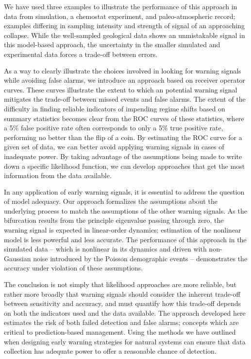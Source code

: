 \documentclass[authoryear,review,11pt]{elsarticle}
\begin{document}
We have used three examples to illustrate the performance of this approach in data from 
simulation, a chemostat experiment, and paleo-atmospheric record; examples differing in 
sampling intensity and strength of signal of an approaching collapse.  
While the well-sampled geological data shows an unmistakable signal in this model-based approach,
the uncertainty in the smaller simulated and experimental data forces a trade-off between errors.  
 
As a way to clearly illustrate the choices involved in looking for warning signals while avoiding false alarms,
we introduce an approach based on receiver operator curves. 
These curves illustrate the extent to which an potential warning signal mitigates the trade-off 
between missed events and false alarms.  
The extent of the difficulty in finding reliable indicators of impending regime shifts
based on summary statistics becomes clear from the ROC curves of these statistics,
where a 5\% false positive rate often corresponds to only a 5\% true positive rate,
performing no better than the flip of a coin. 
By estimating the ROC curve for a given set of data,
we can better avoid applying warning signals in cases of inadequate power.
By taking advantage of the assumptions being made to write down a specific likelihood function,
we can develop approaches that get the most information from the data available.


In any application of early warning signals, it is essential to address the question of model adequacy.
Our approach formalizes the assumptions about the underlying process to match the assumptions of the other warning signals.
As the bifurcation results from the principle eigenvalue passing through zero,
the warning signal is expected in linear-order dynamics;
estimation of the nonlinear model is less powerful and less accurate.
The performance of this approach in the simulated data -- which is nonlinear in its dynamics
and driven with non-Gaussian noise introduced by the Poisson demographic events --
demonstrates the accuracy under violation of these assumptions.

The conclusion is not simply that likelihood approaches are more reliable,
but rather more broadly that warning signals should consider
the inherent trade-off between sensitivity and accuracy,
and must quantify how this trade-off depends on both the indicators used and the data available.
The approach developed here estimates the risk of both failed detection and false alarms;
concepts which are critical to prediction-based management.
Using the methods we have outlined when designing early warning strategies for natural systems
can ensure that data collection has adequate power to offer a reasonable chance of detection.
\end{document}
